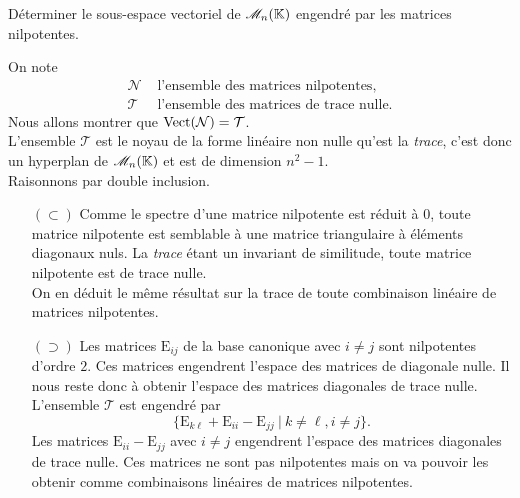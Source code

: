 \begin{exercice}
    Déterminer le sous-espace vectoriel de $\mathscr{M}_n(\mathbb{K})$ engendré par les matrices nilpotentes.
\end{exercice}

\begin{solution}
    On note 
    \begin{align*}
        \mathcal{N} & \text{ l'ensemble des matrices nilpotentes}, \\
        \mathcal{T} & \text{ l'ensemble des matrices de trace nulle.}
    \end{align*}
    Nous allons montrer que $\mathrm{Vect}(\mathcal{N}) = \mathcal{T}$. \\
    L'ensemble $\mathcal{T}$ est le noyau de la forme linéaire non nulle qu'est la \emph{trace}, c'est donc un hyperplan de $\mathscr{M}_n(\mathbb{K})$ et est de dimension $n^2-1$. \\
    Raisonnons par double inclusion.
    \begin{itemize}
        \item[$(\subset)$] Comme le spectre d'une matrice nilpotente est réduit à $0$, toute matrice nilpotente est semblable à une matrice triangulaire à éléments diagonaux nuls. La \emph{trace} étant un invariant de similitude, toute matrice nilpotente est de trace nulle. \\
        On en déduit le même résultat sur la trace de toute combinaison linéaire de matrices nilpotentes.
        \item[$(\supset)$] Les matrices $\mathrm{E}_{ij}$ de la base canonique avec $i \not= j$ sont nilpotentes d'ordre $2$. Ces matrices engendrent l'espace des matrices de diagonale nulle. Il nous reste donc à obtenir l'espace des matrices diagonales de trace nulle. L'ensemble $\mathcal{T}$ est engendré par
        $$\big\{ \mathrm{E}_{k \ell} + \mathrm{E}_{ii} - \mathrm{E}_{jj}\ |\ k \not= \ell, i \not= j \big\}.$$
        Les matrices $\mathrm{E}_{ii} - \mathrm{E}_{jj}$ avec $i \not= j$ engendrent l'espace des matrices diagonales de trace nulle. Ces matrices ne sont pas nilpotentes mais on va pouvoir les obtenir comme combinaisons linéaires de matrices nilpotentes. \\

\end{itemize}
\end{solution}
